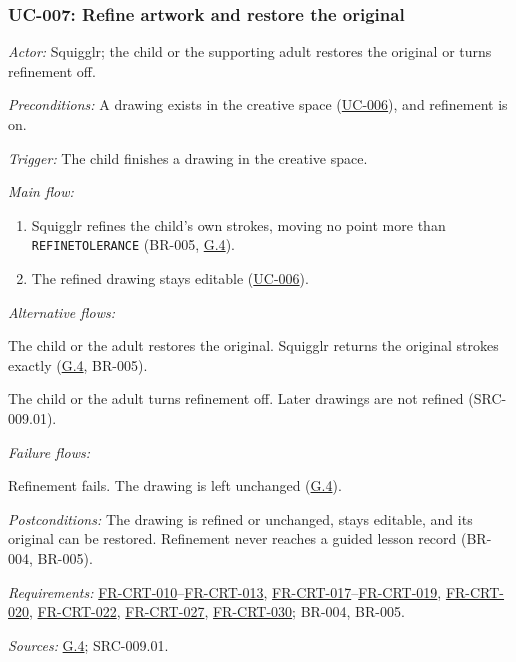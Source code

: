 \documentclass[12pt]{article}
\renewcommand{\_}{\textunderscore\allowbreak}%
\newcommand{\goalref}[1]{\hyperref[goal:#1]{G.#1}}
\newcommand{\ucref}[1]{\hyperref[uc:#1]{\mbox{UC-#1}}}
\newcommand{\reqfield}[2]{\noindent\textit{#1:} #2\par}
\newcommand{\reqref}[1]{\hyperref[req:#1]{#1}}
\providecommand{\ucref}[1]{\hyperref[uc:#1]{UC-#1}}
\begin{document}
\subsubsection{UC-007: Refine artwork and restore the original}
\label{puc:007}
\reqfield{Actor}{Squigglr; the child or the supporting adult restores the
original or turns refinement off.} \reqfield{Preconditions}{A drawing exists in
the creative space (\ucref{006}), and refinement is on.}
\reqfield{Trigger}{The child finishes a drawing in the creative space.}
\noindent\textit{Main flow:}
\begin{enumerate}[nosep, leftmargin=2.2em]
  \item Squigglr refines the child's own strokes, moving no point more than
  \texttt{REFINE\_TOLERANCE} (BR-005, \goalref{4}).
  \item The refined drawing stays editable (\ucref{006}).
\end{enumerate}
\noindent\textit{Alternative flows:}
\begin{description}[nosep, leftmargin=2.2em, font=\normalfont]
  \item[2a.] The child or the adult restores the original. Squigglr returns the
  original strokes exactly (\goalref{4}, BR-005).
  \item[2b.] The child or the adult turns refinement off. Later drawings are not
  refined (\mbox{SRC-009.01}).
\end{description}
\noindent\textit{Failure flows:}
\begin{description}[nosep, leftmargin=2.2em, font=\normalfont]
  \item[1a.] Refinement fails. The drawing is left unchanged (\goalref{4}).
\end{description}
\reqfield{Postconditions}{The drawing is refined or unchanged, stays editable,
and its original can be restored. Refinement never reaches a guided lesson
record (BR-004, BR-005).}
\reqfield{Requirements}{\reqref{FR-CRT-010}--\reqref{FR-CRT-013},
\reqref{FR-CRT-017}--\reqref{FR-CRT-019}, \reqref{FR-CRT-020},
\reqref{FR-CRT-022}, \reqref{FR-CRT-027}, \reqref{FR-CRT-030}; BR-004, BR-005.}
\reqfield{Sources}{\goalref{4}; \mbox{SRC-009.01}.}
\end{document}
